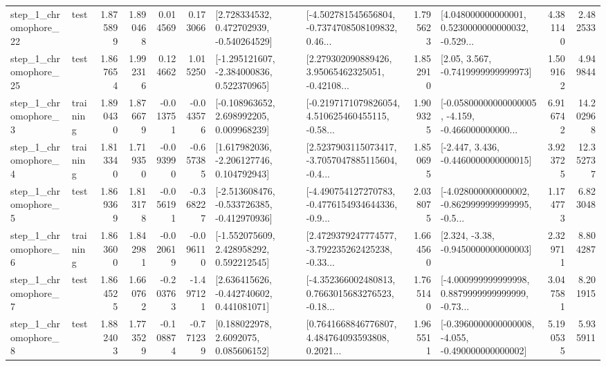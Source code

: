 \begin{tabular}{llrrrrllrlrr}
    step\_1\_chromophore\_22 &      test &      1.875899 &    1.890468 &      0.014569 &  0.173066 &    [2.728334532, 0.472702939, -0.540264529] &  [-4.502781545656804, -0.7374708508109832, 0.46... &       1.795623 &  [4.048000000000001, 0.5230000000000032, -0.529... &            4.381140 &          2.482533 \\
    step\_1\_chromophore\_25 &      test &      1.867654 &    1.992316 &      0.124662 &  1.015250 &   [-1.295121607, -2.384000836, 0.522370965] &  [2.279302090889426, 3.95065462325051, -0.42108... &       1.852910 &                 [2.05, 3.567, -0.7419999999999973] &            1.509162 &          4.949844 \\
     step\_1\_chromophore\_3 &  training &      1.890430 &    1.876679 &     -0.013751 & -0.043576 &    [-0.108963652, 2.698992205, 0.009968239] &  [-0.2197171079826054, 4.510625460455115, -0.58... &       1.909325 &  [-0.05800000000000005, -4.159, -0.466000000000... &            6.916742 &         14.202968 \\
     step\_1\_chromophore\_4 &  training &      1.813340 &    1.719350 &     -0.093990 & -0.657385 &    [1.617982036, -2.206127746, 0.104792943] &  [2.5237903115073417, -3.7057047885115604, -0.4... &       1.850695 &               [-2.447, 3.436, -0.4460000000000015] &            3.923725 &         12.352737 \\
     step\_1\_chromophore\_5 &      test &      1.869369 &    1.813178 &     -0.056191 & -0.368227 &  [-2.513608476, -0.533726385, -0.412970936] &  [-4.490754127270783, -0.4776154934644336, -0.9... &       2.038075 &  [-4.028000000000002, -0.8629999999999995, -0.5... &            1.174773 &          6.823048 \\
     step\_1\_chromophore\_6 &  training &      1.863600 &    1.842981 &     -0.020619 & -0.096110 &    [-1.552075609, 2.428958292, 0.592212545] &  [2.4729379247774577, -3.792235262425238, -0.33... &       1.664560 &                [2.324, -3.38, -0.9450000000000003] &            2.329711 &          8.804287 \\
     step\_1\_chromophore\_7 &      test &      1.864525 &    1.660762 &     -0.203763 & -1.497121 &    [2.636415626, -0.442740602, 0.441081071] &  [-4.352366002480813, 0.7663015683276523, -0.18... &       1.765140 &  [-4.000999999999998, 0.8879999999999999, -0.73... &            3.047581 &          8.201915 \\
     step\_1\_chromophore\_8 &      test &      1.882403 &    1.773529 &     -0.108874 & -0.771239 &       [0.188022978, 2.6092075, 0.085606152] &  [0.7641668846776807, 4.484764093593808, 0.2021... &       1.965511 &  [-0.3960000000000008, -4.055, -0.490000000000002] &            5.190535 &          5.935911 \\

\end{tabular}
